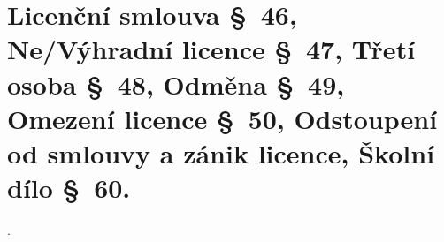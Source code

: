 \section{Licenční smlouva §~46, Ne/Výhradní licence §~47, Třetí osoba §~48, Odměna §~49, Omezení licence §~50, 
Odstoupení od smlouvy a zánik licence, Školní dílo §~60.}.